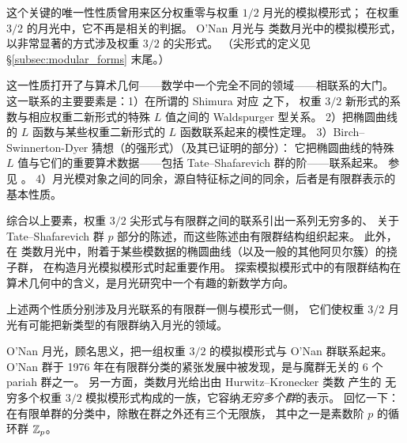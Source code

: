 
这个关键的唯一性性质曾用来区分权重零与权重 $1/2$ 月光的模拟模形式；
在权重 $3/2$ 的月光中，它不再是相关的判据。
O'Nan 月光与 类数月光中的模拟模形式，以非常显著的方式涉及权重 $3/2$ 的尖形式。
（尖形式的定义见 \S\ref{subsec:modular_forms} 末尾。）

这一性质打开了与算术几何——数学中一个完全不同的领域——相联系的大门。
这一联系的主要要素是：1）在所谓的 Shimura 对应 \cite{MR783554} 之下，
权重 $3/2$ 新形式的系数与相应权重二新形式的特殊 $L$ 值之间的 Waldspurger 型关系。
2）把椭圆曲线的 $L$ 函数与某些权重二新形式的 $L$ 函数联系起来的模性定理。
3）Birch–Swinnerton-Dyer 猜想（的强形式）（及其已证明的部分）：
它把椭圆曲线的特殊 $L$ 值与它们的重要算术数据——包括 Tate–Shafarevich 群的阶——联系起来。
参见 \cite{MR833192,MR954295,MR3148103}。
4）月光模对象之间的同余，源自特征标之间的同余，后者是有限群表示的基本性质。



综合以上要素，权重 $3/2$ 尖形式与有限群之间的联系引出一系列无穷多的、
关于 Tate–Shafarevich 群 $p$ 部分的陈述，而这些陈述由有限群结构组织起来。
此外，在 类数月光中，附着于某些模数据的椭圆曲线（以及一般的其他阿贝尔簇）的挠子群，
在构造月光模拟模形式时起重要作用。
探索模拟模形式中的有限群结构在算术几何中的含义，是月光研究中一个有趣的新数学方向。


上述两个性质分别涉及月光联系的有限群一侧与模形式一侧，
它们使权重 $3/2$ 月光有可能把新类型的有限群纳入月光的领域。

O'Nan 月光，顾名思义，把一组权重 $3/2$ 的模拟模形式与 O'Nan 群联系起来。
O'Nan 群于 1976 年在有限群分类的紧张发展中被发现，是与魔群无关的 6 个 pariah 群之一。
另一方面，类数月光给出由 Hurwitz–Kronecker 类数  产生的
无穷多个权重 $3/2$ 模拟模形式构成的一族，它容纳\emph{无穷多个群}的表示。
回忆一下：在有限单群的分类中，除散在群之外还有三个无限族，
其中之一是素数阶 $p$ 的循环群 $\mathbb{Z}_p$。

